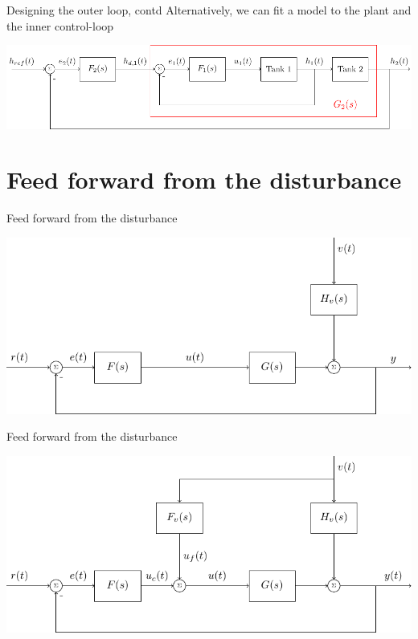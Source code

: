\documentclass[presentation,aspectratio=169, usenames, dvipsnames]{beamer}
\begin{document}
\begin{frame}[label={sec:orgc28b7f7}]{Designing the outer loop, contd}
Alternatively, we can fit a model to the plant and the inner control-loop
\begin{center}
\includegraphics[width=0.9\linewidth]{../../figures/block-diagram-cascade-control-G2}
\end{center}
\end{frame}


\section{Feed forward from the disturbance}
\label{sec:org620b1fc}

\begin{frame}[label={sec:orga9aa4df}]{Feed forward from the disturbance}
\begin{center}
\includegraphics[width=\linewidth]{../../figures/block-diagram-ffw-no-ffw}
\end{center}
\end{frame}

\begin{frame}[label={sec:org3e09e8f}]{Feed forward from the disturbance}
\begin{center}
\includegraphics[width=\linewidth]{../../figures/block-diagram-ffw}
\end{center}
\end{frame}
\end{document}
